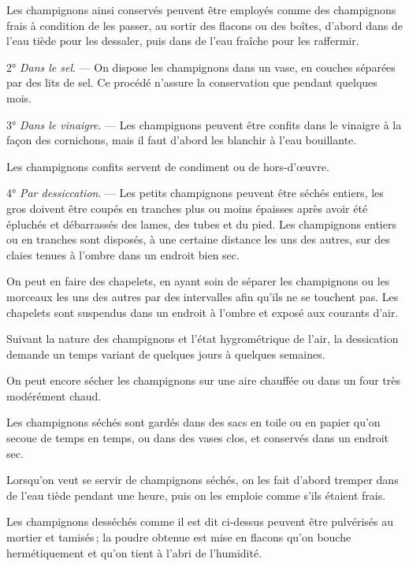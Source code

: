Les champignons ainsi conservés peuvent être employés comme des champignons
frais à condition de les passer, au sortir des flacons ou des boîtes, d'abord
dans de l’eau tiède pour les dessaler, puis dans de l'eau fraîche pour les
raffermir.

\medskip

2° \textit{Dans le sel}. — On dispose les champignons dans un vase, en couches
séparées par des lits de sel. Ce procédé n'assure la conservation que pendant
quelques mois.

\medskip

3° \textit{Dans le vinaigre}. — Les champignons peuvent être confits dans le
vinaigre à la façon des cornichons, mais il faut d'abord les blanchir à l'eau
bouillante.

Les champignons confits servent de condiment ou de hors-d'œuvre.

\medskip

4° \textit{Par dessiccation}. — Les petits champignons peuvent être séchés
entiers, les gros doivent être coupés en tranches plus ou moins épaisses après
avoir été épluchés et débarrassés des lames, des tubes et du pied. Les
champignons entiers ou en tranches sont disposés, à une certaine distance les
uns des autres, sur des claies tenues à l'ombre dans un endroit bien sec.

On peut en faire des chapelets, en ayant soin de séparer les champignons ou les
morceaux les uns des autres par des intervalles afin qu'ils ne se touchent pas.
Les chapelets sont suspendus dans un endroit à l'ombre et exposé aux courants
d'air.

Suivant la nature des champignons et l'état hygrométrique de l'air, la
dessication demande un temps variant de quelques jours à quelques semaines.

On peut encore sécher les champignons sur une aire chauffée ou dans un four
très modérément chaud.

Les champignons séchés sont gardés dans des sacs en toile ou en papier qu'on
secoue de temps en temps, ou dans des vases clos, et conservés dans un endroit
sec.

Lorsqu'on veut se servir de champignons séchés, on les fait d'abord tremper
dans de l’eau tiède pendant une heure, puis on les emploie comme s'ils étaient
frais.

Les champignons desséchés comme il est dit ci-dessus peuvent être pulvérisés au
mortier et tamisés ; la poudre obtenue est mise en flacons qu'on bouche
hermétiquement et qu'on tient à l'abri de l'humidité.

